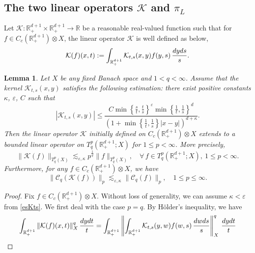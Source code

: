 \documentclass[oneside,english,a4wide]{amsart}
\numberwithin{equation}{section}
\numberwithin{figure}{section}
\theoremstyle{plain}
\theoremstyle{plain}
\theoremstyle{definition}
\theoremstyle{plain}
\newtheorem{lemma}[thm]{Lemma}
\theoremstyle{remark}
\theoremstyle{definition}
\theoremstyle{remark}
\theoremstyle{definition}
\newcommand{\real}{{\mathbb R}}
\newcommand{\e}{\varepsilon}
\newcommand{\8}{+\infty}
\renewcommand{\1}{\mathbbm{1}}
\newcommand{\K}{{\mathcal K}}
\newcommand\norm[1]{ \left\| #1 \right\| }
\newcommand\sk[1]{ \left( #1 \right) }
\newcommand\lk[1]{ \left\{ #1 \right\} }
\renewcommand\d{{\rm d}}
\begin{document}
{\subsection{The two linear operators $\mathcal K$ and $\pi_L$} Let $\K: \real^{d+1}_+ \times \real^{d+1}_+ \to \real$ be a reasonable real-valued function such that for $f\in C_c(\real^{d+1}_+)\otimes X  $, the linear operator $\K$ is well defined as below,
\[
    \K(f)(x, t) := \int_{\real^{d+1}_+} \K_{t, s}(x, y)f(y, s)\,\frac{\d y\d s}{s}.
\]


\begin{lemma}\label{BoundTent}
Let $X$ be any fixed Banach space and $1<q<\infty$. Assume that the kernel $\K_{t, s}(x, y)$ satisfies the following estimation: there exist positive constants $ \kappa $, $ \e$, $C$ such that 
\begin{equation}\label{esKts}
    |\K_{t, s}(x, y)| \leq \frac{ C\min\lk{\frac{s}{t},  \frac{t}{s}}^\e \min\lk{ \frac{1}{t}, \frac{1}{s} }^d }{\sk{ 1 + \min\lk{ \frac{1}{t}, \frac{1}{s} }|x - y| }^{d + \kappa}  }.
\end{equation}
    Then the linear operator $\K$ initially defined on $C_c(\real^{d+1}_+)\otimes X$ extends to a bounded linear operator on $T^p_q(\real^{d+1}_+; X)$ for $1 \leq p < \infty$. More precisely, 
    \[
        \| \K(f) \|_{T^p_q(X)} \lesssim_{\e, \kappa} p^{\frac{1}{q}} \| f \|_{T^p_q(X)}, \quad \forall\, f \in T^p_q(\real^{d+1}_+; X), \ 1 \leq p < \infty.
    \]
    Furthermore, for any $f \in C_c(\real^{d+1}_+)\otimes X$, we have
    \[
        \| \mathcal{C}_q\sk{\K(f)} \|_p \lesssim_{\e, \kappa} \| \mathcal{C}_{q}(f) \|_{p}, \quad 1 \leq p \leq \infty.
    \]
\end{lemma}
\begin{proof}
Fix $f \in C_c(\real^{d+1}_+)\otimes X$. Without loss of generality, we can assume $\kappa < \e$ from \eqref{esKts}.
We first deal with the case $p = q$. By H\"{o}lder's inequality, we have
\[
\begin{aligned}
    \int_{\real^{d+1}_+}\|\K(f)(x, t)\|_X^q\, \frac{\d y \d t}{t} & = \int_{\real^{d+1}_+}\norm{  \int_{\real^{d+1}_+} \K_{t, s}(y, w)f(w, s) \,\frac{\d w\d s}{s} }_X^q \, \frac{\d y \d t}{t} \\

\end{aligned}\]
\end{proof}}
\end{document}
